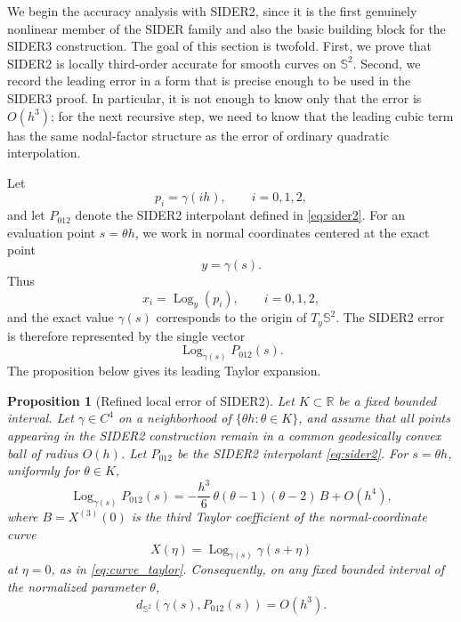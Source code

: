 \documentclass[a4paper,11pt]{article}
\newcommand{\bS}{\mathbb{S}}
\newcommand{\bR}{\mathbb{R}}
\newcommand{\Log}{\operatorname{Log}}
\newtheorem{prop}{Proposition}
\numberwithin{equation}{section}
\begin{document}
We begin the accuracy analysis with SIDER2, since it is the first genuinely
nonlinear member of the SIDER family and also the basic building block for the
SIDER3 construction.  The goal of this section is twofold.  First, we prove
that SIDER2 is locally third-order accurate for smooth curves on \(\bS^2\).
Second, we record the leading error in a form that is precise enough to be
used in the SIDER3 proof.  In particular, it is not enough to know only that
the error is \(O(h^3)\); for the next recursive step, we need to know that the
leading cubic term has the same nodal-factor structure as the error of
ordinary quadratic interpolation.

Let
\[
        p_i=\gamma(ih),\qquad i=0,1,2,
\]
and let \(P_{012}\) denote the SIDER2 interpolant defined in
\eqref{eq:sider2}.  For an evaluation point \(s=\theta h\), we work in normal
coordinates centered at the exact point
\[
        y=\gamma(s).
\]
Thus
\[
        x_i=\Log_y(p_i),\qquad i=0,1,2,
\]
and the exact value \(\gamma(s)\) corresponds to the origin of
\(T_y\bS^2\).  The SIDER2 error is therefore represented by the single vector
\[
        \Log_{\gamma(s)}P_{012}(s).
\]
The proposition below gives its leading Taylor expansion.

\begin{prop}[Refined local error of SIDER2]
\label{prop:sider2_refined}
Let \(K\subset\bR\) be a fixed bounded interval.  Let \(\gamma\in C^4\) on a
neighborhood of \(\{\theta h:\theta\in K\}\), and assume that all points
appearing in the SIDER2 construction remain in a common geodesically convex
ball of radius \(O(h)\).  Let \(P_{012}\) be the SIDER2 interpolant
\eqref{eq:sider2}.  For \(s=\theta h\), uniformly for \(\theta\in K\),
\begin{equation}
\label{eq:sider2_refined}
\Log_{\gamma(s)} P_{012}(s)
=
-\frac{h^3}{6}\,
\theta(\theta-1)(\theta-2)\, B
+O(h^4),
\end{equation}
where \(B=X^{(3)}(0)\) is the third Taylor coefficient of the normal-coordinate
curve
\[
        X(\eta)=\Log_{\gamma(s)}\gamma(s+\eta)
\]
at \(\eta=0\), as in \eqref{eq:curve_taylor}.  Consequently, on any fixed
bounded interval of the normalized parameter \(\theta\),
\[
        d_{\bS^2}\!\left(\gamma(s),P_{012}(s)\right)=O(h^3).
\]
\end{prop}
\end{document}
